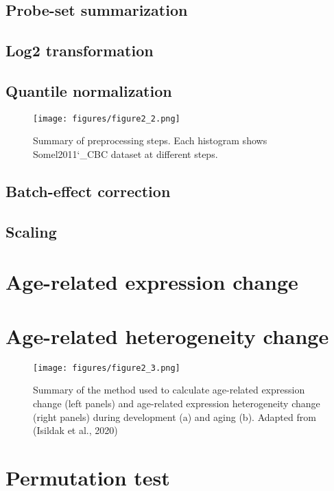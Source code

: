 \subsection{Probe-set summarization}

\subsection{Log2 transformation}

\subsection{Quantile normalization}

\begin{figure}[h]
\centering
\texttt{[image: figures/figure2\_2.png]}
\caption{Summary of preprocessing steps. Each histogram shows Somel2011\char`_CBC dataset at different steps.}\label{fig:fig2.2}
\end{figure}

\subsection{Batch-effect correction}

\subsection{Scaling}

\section{Age-related expression change}

\section{Age-related heterogeneity change}


\begin{figure}[h]
\centering
\texttt{[image: figures/figure2\_3.png]}
\caption{Summary of the method used to calculate age-related expression change (left panels) and age-related expression heterogeneity change (right panels) during development (a) and aging (b). Adapted from (Isildak et al., 2020)}\label{fig:fig2.3}
\end{figure}

\section{Permutation test}

